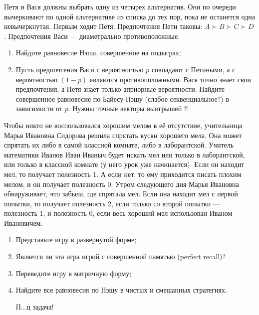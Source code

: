 \begin{problem}[Вето]
Петя и Вася должны выбрать одну из четырех альтернатив. Они по очереди вычеркивают по одной альтернативе из списка до тех пор, пока не останется одна невычеркнутая. Первым ходит Петя. Предпочтения Пети таковы:  $A\succ B\succ C\succ D$. Предпочтения Васи --- диаметрально противоположные.\par
\begin{enumerate}
\item Найдите равновесие Нэша, совершенное на подыграх;\par
\item Пусть предпочтения Васи с вероятностью  $p$  совпадают с Петиными, а с вероятностью  $\left(1-p\right)$  являются противоположными. Вася точно знает свои предпочтения, а Петя знает только априорные вероятности. Найдите совершенное равновесие по Байесу-Нэшу ({\red слабое секвенциальное?}) в зависимости от $p$. {\red Нужны точные векторы выигрышей !!}\par
\end{enumerate}



\begin{sol}

\end{sol}
\end{problem}



\begin{problem}
Чтобы никто не воспользовался хорошим мелом в её отсутствие, учительница Марь{\red я} Ивановна Сидорова решила спрятать куски хорошего мела. Она может спрятать их либо в самой классной комнате, либо в лаборантской. Учитель математики Иванов Иван Иваныч будет искать мел или только в лаборантской, или только в классной комнате (у него урок уже начинается). Если он находит мел, то получает полезность 1. А если нет, то ему приходится писать плохим мелом, и он получает полезность 0. Утром следующего дня Марь{\red я} Ивановна обнаруживает, что забыла, где спрятала мел. Если она находит мел с первой попытки, то получает полезность 2, если только со второй попытки --- полезность 1, и полезность 0, если весь хороший мел использован Иваном Ивановичем.\par
\begin{enumerate}
\item Представьте игру в развернутой форме;\par
\item Является ли эта игра игрой с совершенной памятью (perfect recall)?\par
\item  Переведите игру в матричную форму;\par
\item Найдите все равновесия по Нэшу в чистых и смешанных стратегиях.\par
{\red П...ц задача!}
\end{enumerate}


\begin{sol}

\end{sol}
\end{problem}



